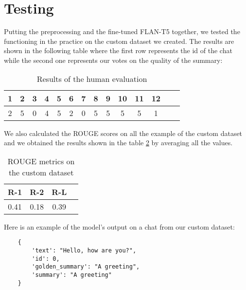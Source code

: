 \documentclass[10pt,twocolumn,letterpaper]{article}
\begin{document}
\section{Testing}
Putting the preprocessing and the fine-tuned FLAN-T5 together, we tested the functioning in the practice on the custom dataset we created. 
The results are shown in the following table where the first row represents the id of the chat while the second
one represents our votes on the quality of the summary:
\begin{table}[h!]
    \centering
    \begin{tabular}{|c|c|c|c|c|c|c|c|c|c|c|c|c|c|}
        \hline
        \rowcolor{lightergray}
        1 & 2 & 3 & 4 & 5 & 6 & 7 & 8 & 9 & 10 & 11 & 12 \\ 
        \hline
        2 & 5 & 0 & 4 & 5 & 2 & 0 & 5 & 5 & 5 & 5 & 1\\
        \hline
    \end{tabular}
\caption{Results of the human evaluation}
\label{table:humanEval}
\end{table} 
We also calculated the ROUGE scores on all the example of the custom dataset and we obtained 
the results shown in the table \ref{table:ROUGEcustom} by averaging all the values.
\begin{table}[h!]
    \centering
    \begin{tabular}{|c|c|c|c|}
        \hline
        \rowcolor{lightergray}
        R-1 & R-2 & R-L \\ 
        \hline
        0.41 & 0.18 & 0.39  \\
        \hline
    \end{tabular}
\caption{ROUGE metrics on the custom dataset}
\label{table:ROUGEcustom}
\end{table} 
Here is an example of the model’s output on a chat from our custom dataset:
\begin{lstlisting}
    {
        'text': "Hello, how are you?",
        'id': 0,
        'golden_summary': "A greeting",
        'summary': "A greeting"
    }
\end{lstlisting}
\end{document}
